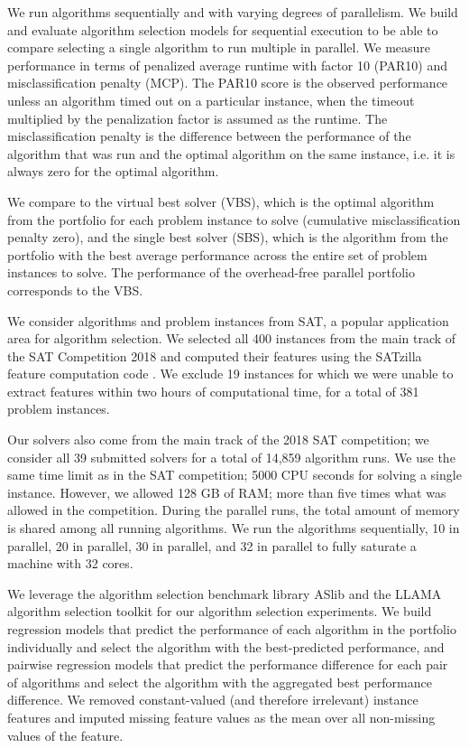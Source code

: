 We run algorithms sequentially and with varying degrees of parallelism. We build and evaluate algorithm selection models for sequential execution to be able to compare selecting a single algorithm to run multiple in parallel. We measure performance in terms of penalized average runtime with factor 10 (PAR10) and misclassification penalty (MCP). The PAR10 score is the observed performance unless an algorithm timed out on a particular instance, when the timeout multiplied by the penalization factor is assumed as the runtime. The misclassification penalty is the difference between the performance of the algorithm that was run and the optimal algorithm on the same instance, i.e. it
is always zero for the optimal algorithm.

We compare to the virtual best solver (VBS), which is the optimal algorithm from the portfolio for each problem instance to solve (cumulative misclassification penalty zero), and the single best solver (SBS), which is the algorithm from the portfolio with the best average performance across the entire set of problem instances to solve. The performance of the overhead-free parallel portfolio corresponds to the VBS.

We consider algorithms and problem instances from SAT, a popular application area for algorithm selection. We selected all 400 instances from the main track of the SAT Competition 2018 \cite{Heule2019} and computed their features using the SATzilla feature computation code \cite{satzilla}. We exclude 19 instances for which we were unable to extract features within two hours of computational time, for a total of 381 problem instances.

Our solvers also come from the main track of the 2018 SAT competition; we consider all 39 submitted solvers for a total of 14,859 algorithm runs. We use the same time limit as in the SAT competition; 5000 CPU seconds for solving a single instance. However, we allowed 128 GB of RAM; more than five times what was allowed in the competition. During the parallel runs, the total amount of memory is shared among all running algorithms. We run the algorithms sequentially, 10 in parallel, 20 in parallel, 30 in parallel, and 32 in parallel to fully saturate a machine with 32 cores.

We leverage the algorithm selection benchmark library ASlib \cite{BISCHL201641} and the LLAMA algorithm selection toolkit \cite{LLAMA} for our algorithm selection experiments. We build regression models that predict the performance of each algorithm in the portfolio individually and select the algorithm with the best-predicted performance, and pairwise regression models that predict the performance difference for each pair of algorithms and select
the algorithm with the aggregated best performance difference. We removed constant-valued (and therefore irrelevant) instance features and imputed missing feature values as the mean over all non-missing values of the feature.

